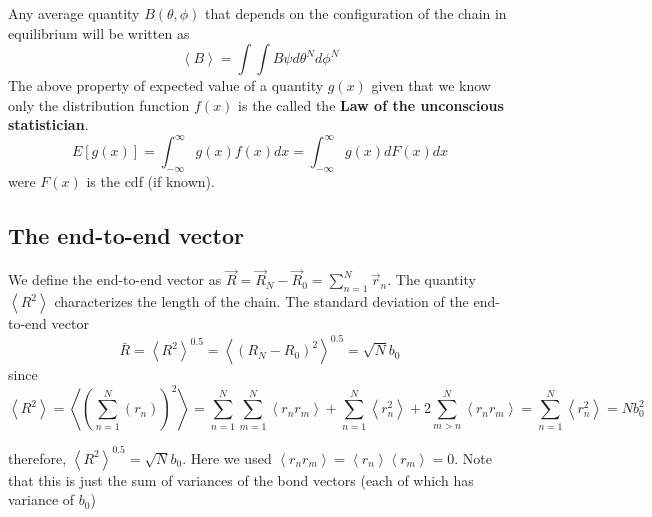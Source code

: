 \documentclass{paper}
\begin{document}
Any average quantity $B(\theta,\phi)$ that depends on the configuration of the chain in equilibrium will be written as  
\begin{equation*}
\left< B\right>=\int\int B \psi d\theta^{N}d\phi^{N}
\end{equation*}
The above property of expected value of a quantity $g(x)$ given that we know only the distribution function $f(x)$ is the called the \textbf{Law of the unconscious statistician}.
\begin{equation*}
E[g(x)]=\int_{-\infty}^{\infty}g(x)f(x)dx = \int_{-\infty}^{\infty}g(x)dF(x)dx
\end{equation*} 
were $F(x)$ is the cdf (if known).

\subsection{The end-to-end vector}\label{subsection_theEndToEndVector}
We define the end-to-end vector as $\vec{R}=\vec{R}_N-\vec{R}_0=\sum_{n=1}^N \vec{r}_n$. The quantity $\left<R^2\right>$ characterizes the length of the chain. The standard deviation of the end-to-end vector
\begin{equation*}
\bar{R}=\left<R^2\right>^{0.5}=\left<(R_N-R_0)^2\right>^{0.5}=\sqrt{N}b_0
\end{equation*} 
since 
\begin{equation*}
\left<R^2\right> = \left<\left(\sum_{n=1}^N(r_n)\right)^2\right>=\sum_{n=1}^N\sum_{m=1}^N\left<r_nr_m\right>+\sum_{n=1}^N\left<r_n^2\right>+2\sum_{m>n}^N\left< r_nr_m\right>=\sum_{n=1}^N\left<r_n^2\right>=Nb_0^2
\end{equation*}

therefore, $\left<R^2\right>^{0.5}=\sqrt{N}b_0$. Here we used  $\left<r_nr_m\right>=\left<r_n\right>\left<r_m\right>=0$. Note that this is just the sum of variances of the bond vectors (each of which has variance of $b_0$)
\end{document}
